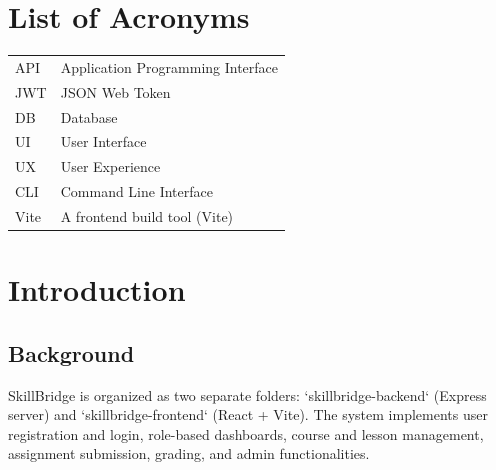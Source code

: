 \documentclass[12pt,a4paper]{report}
\begin{document}
\clearpage

\begin{abstract}
SkillBridge is a full-stack eLearning prototype that demonstrates course creation, lesson authoring, assignment submission, grading, and role-based access control. The system comprises a React + Vite frontend and a Node.js + Express backend with MySQL/MariaDB persistence. This report documents the analysis, design, implementation, testing, and deployment considerations for the project. Sections include system architecture, database design, API specification, implementation details, testing results, challenges encountered, and deployment guidelines. Where project-specific details could not be determined from the repository, sections are marked "[To Be Completed]".
\end{abstract}

\tableofcontents
\listoffigures
\listoftables

\clearpage

\chapter*{List of Acronyms}
\begin{tabular}{lp{11cm}}
API & Application Programming Interface\\
JWT & JSON Web Token\\
DB & Database\\
UI & User Interface\\
UX & User Experience\\
CLI & Command Line Interface\\
Vite & A frontend build tool (Vite)\\
\end{tabular}

\clearpage

\chapter{Introduction}
\section{Background}
SkillBridge is organized as two separate folders: `skillbridge-backend` (Express server) and `skillbridge-frontend` (React + Vite). The system implements user registration and login, role-based dashboards, course and lesson management, assignment submission, grading, and admin functionalities.
\end{document}
